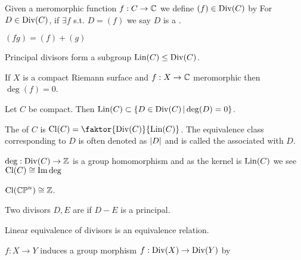 \documentclass{article}
\begin{document}
\begin{definition}
	Given a meromorphic function $f:C \to \mathbb{C}$ we define $(f) \in \operatorname{Div}(C)$ by 
	For $D \in \operatorname{Div}(C)$, if $\exists f$ s.t. $D=(f)$ we say $D$ is a . 
\end{definition}

\begin{lemma}$(fg) = (f)+(g)$
\end{lemma}
\begin{corollary}
	Principal divisors form a subgroup  $\operatorname{Lin}(C) \leq \operatorname{Div}(C)$. 
\end{corollary}

\begin{lemma}
	If $X$ is a compact Riemann surface and $f:X \to \mathbb{C}$ meromorphic then $\deg(f) = 0$. 
\end{lemma}

\begin{prop}
	Let $C$ be compact. Then $\operatorname{Lin}(C) \subset \left\{ D \in \operatorname{Div}(C) \, | \deg(D) = 0 \right\}$. 
\end{prop}

\begin{definition}
	The  of $C$ is $\Cl(C) = \faktor{\Div(C)}{\Lin(C)}$. The equivalence class corresponding to $D$ is often denoted as $\left\lvert D \right\rvert$ and is called the  associated with $D$. 
\end{definition}

\begin{remark}
	$\deg: \operatorname{Div}(C) \to \mathbb{Z}$ is a group homomorphism and as the kernel is $\operatorname{Lin}(C)$ we see $\operatorname{Cl}(C) \cong \operatorname{Im} \deg$
\end{remark}
\begin{corollary}
	$\operatorname{Cl}(\mathbb{CP}^n) \cong \mathbb{Z}$. 
\end{corollary}

\begin{definition}
	Two divisors $D,E$ are  if $D-E$ is a principal.
\end{definition}

\begin{lemma}
	Linear equivalence of divisors is an equivalence relation. 
\end{lemma}

\begin{lemma}
	$f:X \to Y$ induces a group morphism $f:\operatorname{Div}(X) \to \operatorname{Div}(Y)$ by 
\end{lemma}
\end{document}
